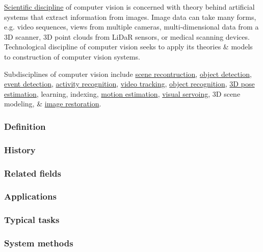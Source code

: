 \documentclass{article}
\begin{document}
\href{https://en.wikipedia.org/wiki/Scientific_discipline}{Scientific discipline} of computer vision is concerned with theory behind artificial systems that extract information from images. Image data can take many forms, e.g. video sequences, views from multiple cameras, multi-dimensional data from a 3D scanner, 3D point clouds from LiDaR sensors, or medical scanning devices. Technological discipline of computer vision seeks to apply its theories \& models to construction of computer vision systems.

Subdisciplines of computer vision include \href{https://en.wikipedia.org/wiki/3D_reconstruction}{scene recontruction}, \href{https://en.wikipedia.org/wiki/Object_detection}{object detection}, \href{https://en.wikipedia.org/wiki/Event_detection}{event detection}, \href{https://en.wikipedia.org/wiki/Activity_recognition}{activity recognition}, \href{https://en.wikipedia.org/wiki/Video_tracking}{video tracking}, \href{https://en.wikipedia.org/wiki/Object_recognition}{object recognition}, \href{https://en.wikipedia.org/wiki/3D_pose_estimation}{3D pose estimation}, learning, indexing, \href{https://en.wikipedia.org/wiki/Motion_estimation}{motion estimation}, \href{https://en.wikipedia.org/wiki/Visual_servoing}{visual servoing}, 3D scene modeling, \& \href{https://en.wikipedia.org/wiki/Digital_photograph_restoration}{image restoration}.

\subsubsection{Definition}

\subsubsection{History}

\subsubsection{Related fields}

\subsubsection{Applications}

\subsubsection{Typical tasks}

\subsubsection{System methods}
\end{document}

